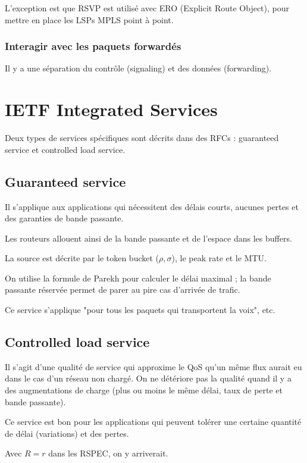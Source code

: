 			L'exception est que RSVP est utilisé avec ERO (Explicit Route Object), pour mettre en place les LSPs MPLS point à point.
			
			\subsubsection{Interagir avec les paquets forwardés} Il y a une séparation du contrôle (signaling) et des données (forwarding).
		
		\section{IETF Integrated Services}
			
		
		Deux types de services spécifiques sont décrits dans des RFCs : guaranteed service et controlled load service.
		
		
			\subsection{Guaranteed service}
			
			Il s'applique aux applications qui nécessitent des délais courts, aucunes pertes et des garanties de bande passante.
			
			Les routeurs allouent ainsi de la bande passante et de l'espace dans les buffers.
			
			La source est décrite par le token bucket ($\rho, \sigma$), le peak rate et le MTU.
			
			On utilise la formule de Parekh pour calculer le délai maximal ; la bande passante réservée permet de parer au pire cas d'arrivée de trafic.
			
			Ce service s'applique "pour tous les paquets qui transportent la voix", etc.
			
			\subsection{Controlled load service}
		
			Il s'agit d'une qualité de service qui approxime le QoS qu'un même flux aurait eu dans le cas d'un réseau non chargé. On ne détériore pas la qualité quand il y a des augmentations de charge (plus ou moins le même délai, taux de perte et bande passante).
			
			Ce service est bon pour les applications qui peuvent tolérer une certaine quantité de délai (variations) et des pertes.
			
			Avec $R = r$ dans les RSPEC, on y arriverait.